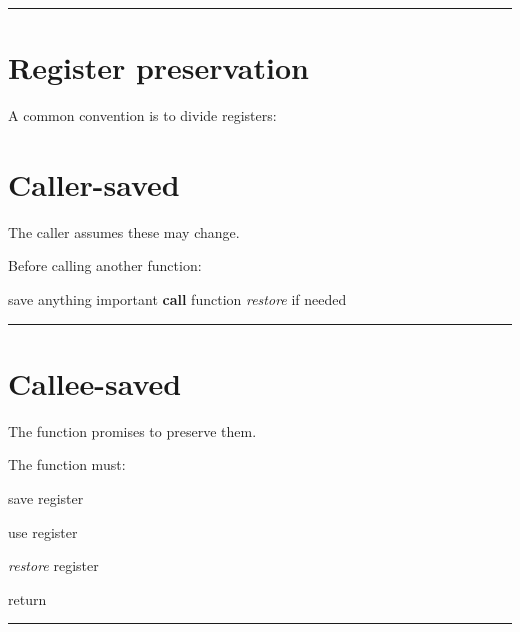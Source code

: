 \documentclass[
  oneside,
  openany]{book}
\newenvironment{Shaded}{\begin{snugshade}}{\end{snugshade}}
\newcommand{\ControlFlowTok}[1]{\textcolor[rgb]{0.13,0.29,0.53}{\textbf{#1}}}
\newcommand{\NormalTok}[1]{#1}
\newcommand{\PreprocessorTok}[1]{\textcolor[rgb]{0.56,0.35,0.01}{\textit{#1}}}
\begin{document}
\begin{center}\rule{0.5\linewidth}{0.5pt}\end{center}

\hypertarget{register-preservation}{%
\section{Register preservation}\label{register-preservation}}

A common convention is to divide registers:

\hypertarget{caller-saved}{%
\section{Caller-saved}\label{caller-saved}}

The caller assumes these may change.

Before calling another function:

\begin{Shaded}
\begin{Highlighting}[]
\NormalTok{save anything important}
\ControlFlowTok{call}\NormalTok{ function}
\PreprocessorTok{restore}\NormalTok{ if needed}
\end{Highlighting}
\end{Shaded}

\begin{center}\rule{0.5\linewidth}{0.5pt}\end{center}

\hypertarget{callee-saved}{%
\section{Callee-saved}\label{callee-saved}}

The function promises to preserve them.

The function must:

\begin{Shaded}
\begin{Highlighting}[]
\NormalTok{save register}

\NormalTok{use register}

\PreprocessorTok{restore}\NormalTok{ register}

\NormalTok{return}
\end{Highlighting}
\end{Shaded}

\begin{center}\rule{0.5\linewidth}{0.5pt}\end{center}
\end{document}
